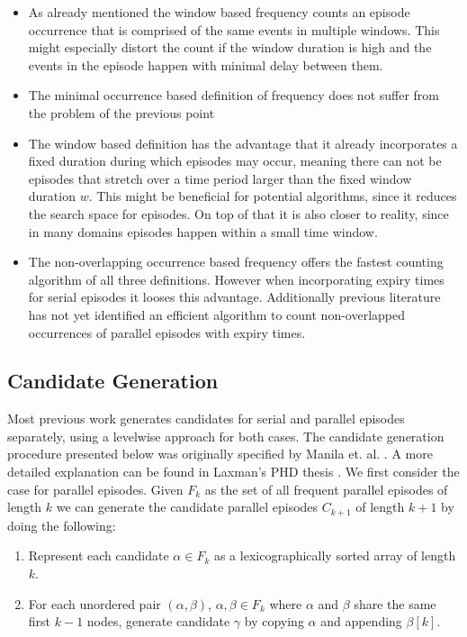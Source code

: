 \begin{itemize}
	\item As already mentioned the window based frequency counts an episode occurrence that is comprised of the same events in multiple windows. This might especially distort the count if the window duration is high and the events in the episode happen with minimal delay between them.
	\item The minimal occurrence based definition of frequency does not suffer from the problem of the previous point
	\item The window based definition has the advantage that it already incorporates a fixed duration during which episodes may occur, meaning there can not be episodes that stretch over a time period larger than the fixed window duration $w$. This might be beneficial for potential algorithms, since it reduces the search space for episodes. On top of that it is also closer to reality, since in many domains episodes happen within a small time window.
	\item The non-overlapping occurrence based frequency offers the fastest counting algorithm of all three definitions. However when incorporating expiry times for serial episodes it looses this advantage. Additionally previous literature has not yet identified an efficient algorithm to count non-overlapped occurrences of parallel episodes with expiry times. 
\end{itemize}

\subsection{Candidate Generation}
\label{subsec_candidateGen}
Most previous work generates candidates for serial and parallel episodes separately, using a levelwise approach for both cases. The candidate generation procedure presented below was originally specified by Manila et. al. \cite{mannila1997discovery}. A more detailed explanation can be found in Laxman's PHD thesis \cite{laxman2006discovering}. \newline
We first consider the case for parallel episodes. Given $F_k$ as the set of all frequent parallel episodes of length $k$ we can generate the candidate parallel episodes $C_{k+1}$ of length $k+1$ by doing the following:

\begin{enumerate}
	\item Represent each candidate $\alpha \in F_k$ as a lexicographically sorted array of length $k$.
	\item For each unordered pair $(\alpha , \beta )$, $\alpha ,\beta \in F_k$ where $\alpha$ and $\beta$ share the same first $k-1$ nodes, generate candidate $\gamma$ by copying $\alpha$ and appending $\beta [k]$.
\end{enumerate}

